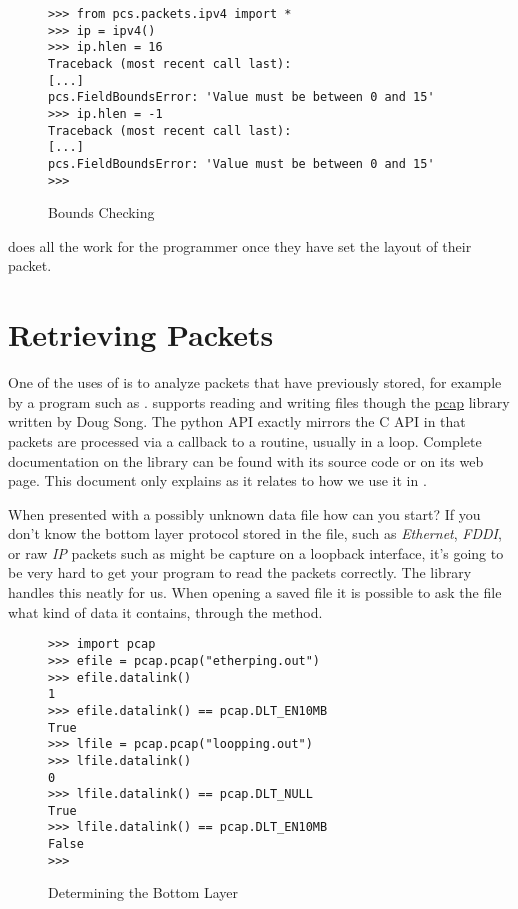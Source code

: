 \documentclass[11pt]{article}
\begin{document}
\begin{figure}
  \centering
\begin{verbatim}
>>> from pcs.packets.ipv4 import *
>>> ip = ipv4()
>>> ip.hlen = 16
Traceback (most recent call last):
[...]
pcs.FieldBoundsError: 'Value must be between 0 and 15'
>>> ip.hlen = -1
Traceback (most recent call last):
[...]
pcs.FieldBoundsError: 'Value must be between 0 and 15'
>>> 
\end{verbatim}
  \caption{Bounds Checking}
  \label{fig:bounds-checking-1}
\end{figure}

 does all the work for the programmer once they have set
the layout of their packet.

\section{Retrieving Packets}
\label{sec:retrieving-packets}

One of the uses of  is to analyze packets that have
previously stored, for example by a program such as
.   supports reading and writing
 files though the
\href{http://monkey.org/~dugsong/pypcap/}{pcap} library written by
Doug Song.  The python API exactly mirrors the C API in that packets
are processed via a callback to a  routine, usually
in a loop.  Complete documentation on the  library can
be found with its source code or on its web page.  This document only
explains  as it relates to how we use it in
.

When presented with a possibly unknown data file how can you start?
If you don't know the bottom layer protocol stored in the file, such
as \emph{Ethernet}, \emph{FDDI}, or raw \emph{IP} packets such as
might be capture on a loopback interface, it's going to be very hard
to get your program to read the packets correctly.  The 
library handles this neatly for us.  When opening a saved file it is
possible to ask the file what kind of data it contains, through the
 method.

\begin{figure}
  \centering
\begin{verbatim}
>>> import pcap
>>> efile = pcap.pcap("etherping.out")
>>> efile.datalink()
1
>>> efile.datalink() == pcap.DLT_EN10MB
True
>>> lfile = pcap.pcap("loopping.out")
>>> lfile.datalink()
0
>>> lfile.datalink() == pcap.DLT_NULL
True
>>> lfile.datalink() == pcap.DLT_EN10MB
False
>>> 
\end{verbatim}
  \caption{Determining the Bottom Layer}
  \label{fig:determining-the-bottom-layer}
\end{figure}
\end{document}
